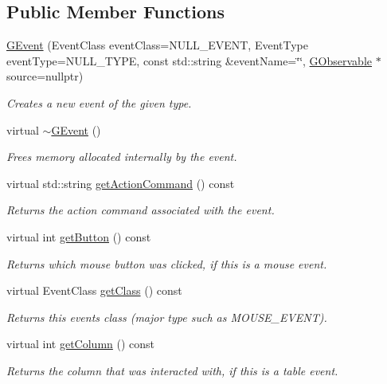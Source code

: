 \subsection*{Public Member Functions}
\begin{DoxyCompactItemize}
\item 
\mbox{\hyperlink{classGEvent_a310475311d619e2b4066a0ee34c1153e}{G\+Event}} (Event\+Class event\+Class=N\+U\+L\+L\+\_\+\+E\+V\+E\+NT, Event\+Type event\+Type=N\+U\+L\+L\+\_\+\+T\+Y\+PE, const std\+::string \&event\+Name=\char`\"{}\char`\"{}, \mbox{\hyperlink{classGObservable}{G\+Observable}} $\ast$source=nullptr)
\begin{DoxyCompactList}\small\item\em Creates a new event of the given type. \end{DoxyCompactList}\item 
virtual \mbox{\hyperlink{classGEvent_a294ad1d22669baa2bae04f3d75eb183c}{$\sim$\+G\+Event}} ()
\begin{DoxyCompactList}\small\item\em Frees memory allocated internally by the event. \end{DoxyCompactList}\item 
virtual std\+::string \mbox{\hyperlink{classGEvent_a94eb4276000c4fdfb508ce9e6317a82a}{get\+Action\+Command}} () const
\begin{DoxyCompactList}\small\item\em Returns the action command associated with the event. \end{DoxyCompactList}\item 
virtual int \mbox{\hyperlink{classGEvent_a206a3a5ac61ccb2de0208401739c5425}{get\+Button}} () const
\begin{DoxyCompactList}\small\item\em Returns which mouse button was clicked, if this is a mouse event. \end{DoxyCompactList}\item 
virtual Event\+Class \mbox{\hyperlink{classGEvent_a389eadf538a5311effff6a08d0426b34}{get\+Class}} () const
\begin{DoxyCompactList}\small\item\em Returns this event\textquotesingle{}s class (major type such as M\+O\+U\+S\+E\+\_\+\+E\+V\+E\+NT). \end{DoxyCompactList}\item 
virtual int \mbox{\hyperlink{classGEvent_a36cb86612277798a9adb168403386280}{get\+Column}} () const
\begin{DoxyCompactList}\small\item\em Returns the column that was interacted with, if this is a table event. \end{DoxyCompactList}\item 

\end{DoxyCompactItemize}

